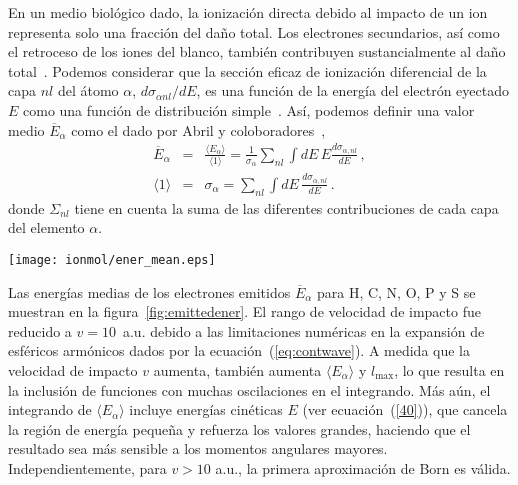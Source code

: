 En un medio biológico dado, la ionización directa debido al impacto de
un ion representa solo una fracción del daño total. Los electrones
secundarios, así como el retroceso de los iones del blanco, también
contribuyen sustancialmente al daño total~\cite{Denifl2011}. 
Podemos considerar que la sección eficaz de ionización diferencial de la
capa $nl$ del átomo $\alpha$, $d\sigma_{\alpha nl}/dE$, es una función 
de la energía del electrón eyectado $E$ como una función de distribución
simple~\cite{surdutovic2018}. Así, podemos definir una valor medio 
$\overline{E}_{\alpha}$ como el dado por Abril y 
coloboradores~\cite{abril2015},
\begin{eqnarray}
\overline{E}_{\alpha} &=&\frac{\langle E_{\alpha}\rangle}{\langle
1\rangle}=\frac{1}{\sigma_{\alpha}}\sum\limits_{nl}\int dE\,E
\frac{d\sigma_{\alpha,nl}}{dE}\,,  
\label{40} \\
\langle 1\rangle &=&\sigma_{\alpha}=\sum\limits_{nl}\int dE\,
\frac{d\sigma_{\alpha,nl}}{dE}\,. 
\label{50}
\end{eqnarray}
donde $\Sigma_{nl}$ tiene en cuenta la suma de las diferentes 
contribuciones de cada capa del elemento $\alpha$.

\begin{figure*}[t!]
\centering
\texttt{[image: ionmol/ener\_mean.eps]}
\caption[Distribución energética media de electrones emitidos.]
{Distribución energética media de electrones emitidos por ionización 
debido al impacto de iones cargados dado por la ecuación~(\ref{40}). 
La línea punteada corresponde a la aproximación de Born con $Z=1$.
La línea discontinua y las líneas sólidas hacen referencia a $\bar{p}$ e 
iones de carga $+1$, $+2$, $+4$, $+6$ y $+8$, respectivamente.}
\label{fig:emittedener}
\end{figure*} 

Las energías medias de los electrones emitidos $\overline{E}_{\alpha}$ 
para H, C, N, O, P y S se muestran en la figura~\ref{fig:emittedener}. 
El rango de velocidad de impacto fue reducido a $v=10$~a.u. debido 
a las limitaciones numéricas en la expansión de esféricos armónicos dados
por la ecuación~(\ref{eq:contwave}). A medida que la velocidad de 
impacto $v$ aumenta, también aumenta $\langle E_{\alpha}\rangle$ y
$l_{\max}$, lo que resulta en la inclusión de funciones con muchas 
oscilaciones en el integrando. Más aún, el integrando de 
$\langle E_{\alpha}\rangle$ incluye energías cinéticas $E$
(ver ecuación~(\ref{40})), que cancela la región de energía pequeña y 
refuerza los valores grandes, haciendo que el resultado sea más 
sensible a los momentos angulares mayores. Independientemente, para 
$v>10$ a.u., la primera aproximación de Born es válida. 


